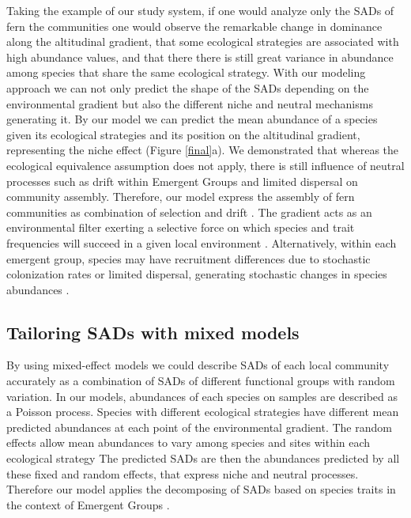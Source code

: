 \documentclass[12pt]{article}
\begin{document}
Taking the example of our study system, if one would analyze only the SADs of fern the communities one would observe the remarkable change in dominance along the altitudinal gradient, that some ecological strategies are associated with high abundance values, and that there there is still great variance in abundance among species that
share the same ecological strategy.  
With our modeling approach we can not only predict the shape of the SADs depending on the environmental gradient but also the different niche and neutral mechanisms generating it. By our model we can predict the mean abundance of a species given its ecological strategies and its position on the altitudinal gradient, representing the niche effect (Figure \ref{final}a).%
We demonstrated that whereas the
ecological equivalence assumption does not apply, there is still
influence of neutral processes such as drift within Emergent Groups
and limited dispersal on community assembly.
Therefore, our model express the assembly of fern communities as combination of 
selection and drift \citep{Vellend2010}. The gradient acts as an environmental
filter exerting a selective force on which species and trait frequencies will succeed
in a given local environment \citep{Webb2010}. 
Alternatively, within each emergent group,
species may have recruitment differences due to stochastic colonization
rates or limited dispersal, generating stochastic changes in species
abundances \citep{Gravel2006, Weiher2011}.


\subsection*{Tailoring SADs with mixed models} 

By using mixed-effect models we could describe SADs of each local
community accurately as a combination
of SADs of different functional groups with random variation.
In our models, abundances of each species on samples are described as a
Poisson process. Species with different ecological strategies have
different mean predicted abundances at each point of the environmental
gradient. The random effects allow
mean abundances to vary among species and sites within each ecological
strategy %
The predicted SADs are then the
abundances predicted 
by all these fixed and random effects, that express niche and neutral
processes. %
Therefore our model applies the  
decomposing of SADs based on species traits \citep{Magurran2003} in
the context of Emergent Groups \citep{Herault2007}.
\end{document}
